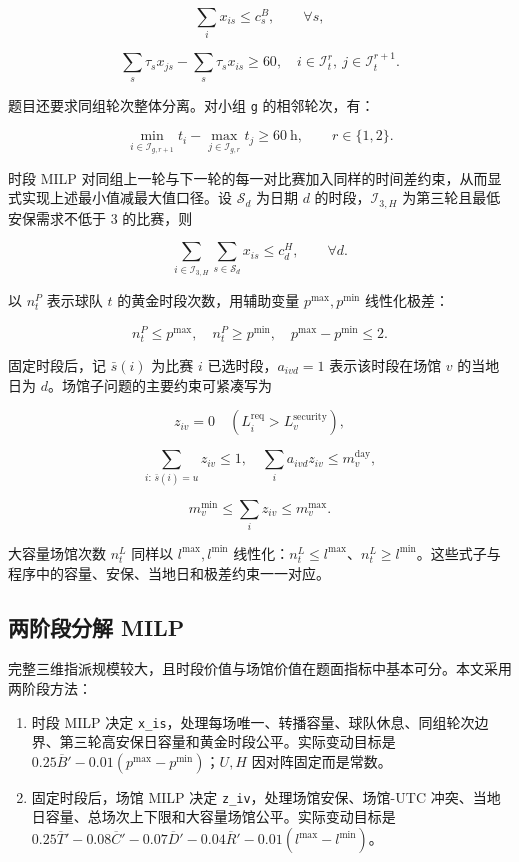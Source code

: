 \[
\sum_i x_{is}\le c_s^{B},\qquad \forall s,
\]

\[
\sum_s\tau_s x_{js}-\sum_s\tau_s x_{is}\ge 60,
\quad i\in\mathcal I_t^r,\ j\in\mathcal I_t^{r+1}.
\]

题目还要求同组轮次整体分离。对小组 \texttt{g} 的相邻轮次，有：

\[
\min_{i\in\mathcal I_{g,r+1}}t_i-
\max_{j\in\mathcal I_{g,r}}t_j\ge 60\ \mathrm{h},
\qquad r\in\{1,2\}.
\]

时段 MILP 对同组上一轮与下一轮的每一对比赛加入同样的时间差约束，从而显式实现上述最小值减最大值口径。设 $\mathcal S_d$ 为日期 $d$ 的时段，$\mathcal I_{3,H}$ 为第三轮且最低安保需求不低于 3 的比赛，则

\[
\sum_{i\in\mathcal I_{3,H}}\sum_{s\in\mathcal S_d}x_{is}
\le c_d^{H},\qquad \forall d.
\]

以 $n_t^P$ 表示球队 $t$ 的黄金时段次数，用辅助变量 $p^{\max},p^{\min}$ 线性化极差：

\[
n_t^P\le p^{\max},\quad n_t^P\ge p^{\min},\quad
p^{\max}-p^{\min}\le 2.
\]

固定时段后，记 $\bar s(i)$ 为比赛 $i$ 已选时段，$a_{ivd}=1$ 表示该时段在场馆 $v$ 的当地日为 $d$。场馆子问题的主要约束可紧凑写为

\[
z_{iv}=0\quad(L_i^{\mathrm{req}}>L_v^{\mathrm{security}}),
\]

\[
\sum_{i:\,\bar s(i)=u}z_{iv}\le1,
\quad
\sum_i a_{ivd}z_{iv}\le m_v^{\mathrm{day}},
\]

\[
m_v^{\min}\le\sum_i z_{iv}\le m_v^{\max}.
\]

大容量场馆次数 $n_t^L$ 同样以 $l^{\max},l^{\min}$ 线性化：$n_t^L\le l^{\max}$、$n_t^L\ge l^{\min}$。这些式子与程序中的容量、安保、当地日和极差约束一一对应。

\subsection{两阶段分解 MILP}

完整三维指派规模较大，且时段价值与场馆价值在题面指标中基本可分。本文采用两阶段方法：

\begin{enumerate}
\def\labelenumi{\arabic{enumi}.}
\tightlist
\item
  时段 MILP 决定 \texttt{x\_is}，处理每场唯一、转播容量、球队休息、同组轮次边界、第三轮高安保日容量和黄金时段公平。实际变动目标是 $0.25\overline B'-0.01(p^{\max}-p^{\min})$；$U,H$ 因对阵固定而是常数。
\item
  固定时段后，场馆 MILP 决定 \texttt{z\_iv}，处理场馆安保、场馆-UTC 冲突、当地日容量、总场次上下限和大容量场馆公平。实际变动目标是 $0.25\overline T'-0.08\overline C'-0.07\overline D'-0.04\overline R'-0.01(l^{\max}-l^{\min})$。
\end{enumerate}

